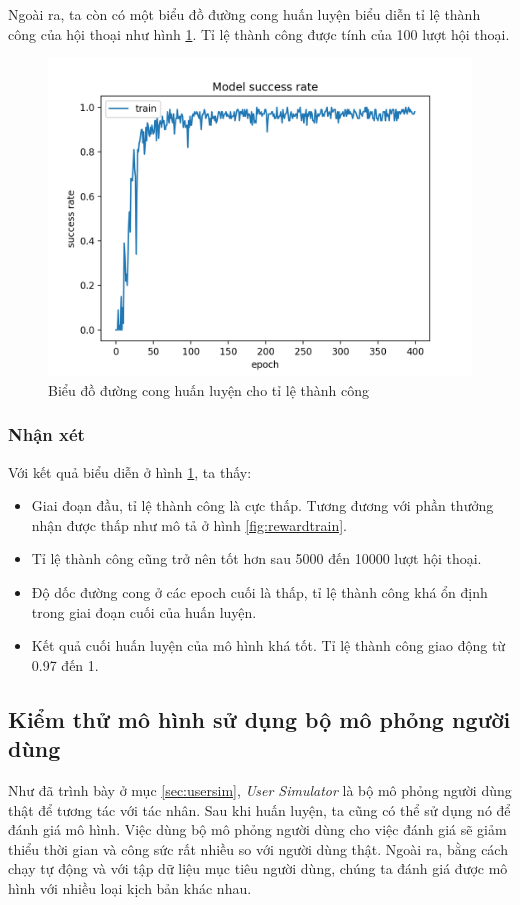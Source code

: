 Ngoài ra, ta còn có một biểu đồ đường cong huấn luyện biểu diễn
tỉ lệ thành công của hội thoại như hình \ref{fig:successtrain}.
Tỉ lệ thành công được tính của 100 lượt hội thoại.

\begin{figure}[ht!]
    \centering
    \includegraphics[scale=0.95]{thesis/chatbot/ketqua/img/successtrain.png}
    \caption{Biểu đồ đường cong huấn luyện cho tỉ lệ thành công}
    \label{fig:successtrain}
\end{figure}

\subsubsection{Nhận xét}
Với kết quả biểu diễn ở hình \ref{fig:successtrain}, ta thấy:

\begin{itemize}
    \item Giai đoạn đầu, tỉ lệ thành công là cực thấp. Tương đương
    với phần thưởng nhận được thấp như mô tả ở hình \ref{fig:rewardtrain}.
    \item Tỉ lệ thành công cũng trở nên tốt hơn sau 5000 đến
    10000 lượt hội thoại.
    \item Độ dốc đường cong ở các epoch cuối là thấp, tỉ lệ
    thành công khá ổn định trong giai đoạn cuối của huấn luyện.
    \item Kết quả cuối huấn luyện của mô hình khá tốt.
    Tỉ lệ thành công giao động từ 0.97 đến 1.
\end{itemize}

\subsection{Kiểm thử mô hình sử dụng bộ mô phỏng người dùng}
Như đã trình bày ở mục \ref{sec:usersim}, \textit{User Simulator} là
bộ mô phỏng người dùng thật để tương tác với tác nhân. Sau khi
huấn luyện, ta cũng có thể sử dụng nó để đánh giá mô hình. Việc dùng
bộ mô phỏng người dùng cho việc đánh giá sẽ giảm thiểu thời gian và
công sức rất nhiều so với người dùng thật. Ngoài ra, bằng cách chạy
tự động và với tập dữ liệu mục tiêu người dùng, chúng ta đánh giá
được mô hình với nhiều loại kịch bản khác nhau.

